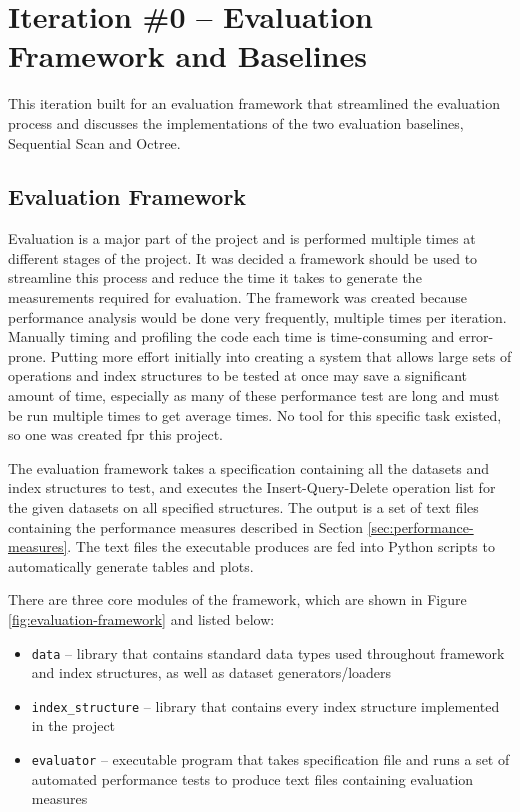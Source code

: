 \section{Iteration \#0 -- Evaluation Framework and Baselines}

This iteration built for an evaluation framework that streamlined the evaluation process and discusses the implementations of the two evaluation baselines, Sequential Scan and Octree.

\subsection{Evaluation Framework}

Evaluation is a major part of the project and is performed multiple times at different stages of the project. It was decided a framework should be used to streamline this process and reduce the time it takes to generate the measurements required for evaluation.  The framework was created because performance analysis would be done very frequently, multiple times per iteration. Manually timing and profiling the code each time is time-consuming and error-prone. Putting more effort initially into creating a system that allows large sets of operations and index structures to be tested at once may save a significant amount of time, especially as many of these performance test are long and must be run multiple times to get average times. No tool for this specific task existed, so one was created fpr this project.

The evaluation framework takes a specification containing all the datasets and index structures to test, and executes the Insert-Query-Delete operation list for the given datasets on all specified structures. The output is a set of text files containing the performance measures described in Section \ref{sec:performance-measures}. The text files the executable produces are fed into Python scripts to automatically generate tables and plots.

There are three core modules of the framework, which are shown in Figure \ref{fig:evaluation-framework} and listed below:
\begin{itemize}
	\item \texttt{data} -- library that contains standard data types used throughout framework and index structures, as well as dataset generators/loaders
	\item \texttt{index\_structure} -- library that contains every index structure implemented in the project
	\item \texttt{evaluator} -- executable program that takes specification file and runs a set of automated performance tests to produce text files containing evaluation measures
\end{itemize}

